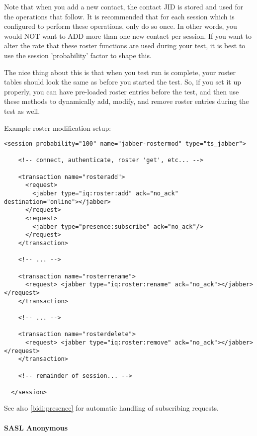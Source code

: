 \documentclass{TSUNG-en}
\begin{document}
Note that when you add a new contact, the contact JID is stored and used for the operations that follow. It is recommended that for each session which is configured to perform these operations, only do so once. In other words, you would NOT want to ADD more than one new contact per session. If you want to alter the rate that these roster functions are used during your test, it is best to use the session 'probability' factor to shape this.

The nice thing about this is that when you test run is complete, your roster tables should look the same as before you started the test. So, if you set it up properly, you can have pre-loaded roster entries before the test, and then use these methods to dynamically add, modify, and remove roster entries during the test as well.

Example roster modification setup:

\begin{Verbatim}
<session probability="100" name="jabber-rostermod" type="ts_jabber">

    <!-- connect, authenticate, roster 'get', etc... -->

    <transaction name="rosteradd">
      <request>
        <jabber type="iq:roster:add" ack="no_ack" destination="online"></jabber>
      </request>
      <request>
        <jabber type="presence:subscribe" ack="no_ack"/>
      </request>
    </transaction>

    <!-- ... -->

    <transaction name="rosterrename">
      <request> <jabber type="iq:roster:rename" ack="no_ack"></jabber> </request>
    </transaction>

    <!-- ... -->

    <transaction name="rosterdelete">
      <request> <jabber type="iq:roster:remove" ack="no_ack"></jabber> </request>
    </transaction>

    <!-- remainder of session... -->

  </session>
\end{Verbatim}

See also \ref{bidi:presence} for automatic handling of  subscribing requests.


\paragraph{SASL Anonymous}
\end{document}
